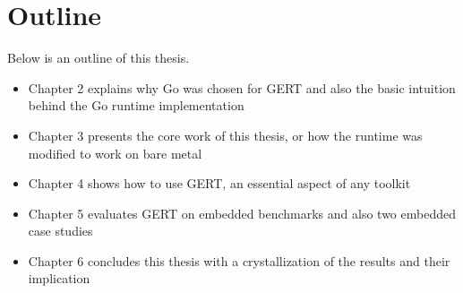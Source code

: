\section{Outline}
Below is an outline of this thesis.
\begin{itemize}
  \item Chapter 2 explains why Go was chosen for GERT and also the basic intuition behind the Go runtime implementation
  \item Chapter 3 presents the core work of this thesis, or how the runtime was modified to work on bare metal
  \item Chapter 4 shows how to use GERT, an essential aspect of any toolkit
  \item Chapter 5 evaluates GERT on embedded benchmarks and also two embedded case studies
  \item Chapter 6 concludes this thesis with a crystallization of the results and their implication
\end{itemize}
